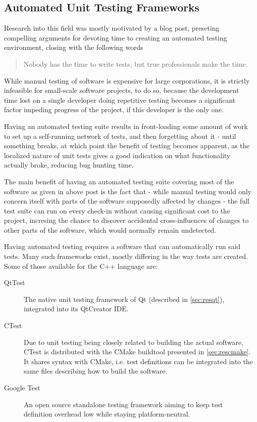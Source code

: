 \subsection{Automated Unit Testing Frameworks}

Research into this field was mostly motivated by a blog post, preseting compelling arguments for devoting time to creating an automated testing environment, closing with the following words
\begin{quote}
Nobody has the time to write tests, but true professionals make the time. 
\end{quote}

While manual testing of software is expensive for large corporations, it is strictly infeasible for small-scale software projects, to do so, because the development time lost on a single developer doing repetitive testing becomes a significant factor impeding progress of the project, if this developer is the only one. 

Having an automated testing suite results in front-loading some amount of work to set up a self-running network of tests, and then forgetting about it - until something breaks, at which point the benefit of testing becomes apparent, as the localized nature of unit tests gives a good indication on what functionality actually broke, reducing bug hunting time.

The main benefit of having an automated testing suite covering most of the software as given in above post is the fact that - while manual testing would only concern itself with parts of the software supposedly affected by changes - the full test suite can run on every check-in without causing significant cost to the project, incresing the chance to discover accidental cross-influences of changes to other parts of the software, which would normally remain undetected.

Having automated testing requires a software that can automatically run said tests. Many such frameworks exist, mostly differing in the way tests are created. Some of those available for the C++ language are:
\begin{description}
	\item[QtTest] The native unit testing framework of Qt (described in \ref{sec:resqt}), integrated into its QtCreator IDE.
	\item[CTest] Due to unit testing being closely related to building the actual software, CTest is distributed with the CMake buildtool presented in \ref{sec:rescmake}. It shares syntax with CMake, i.e. test definitions can be integrated into the same files describing how to build the software.
	\item[Google Test]  An open source standalone testing framework aiming to keep test definition overhead low while staying platform-neutral.
\end{description}

